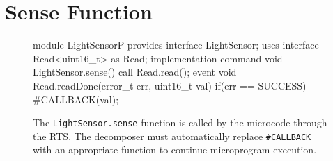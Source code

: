 \chapter{Sense Function}
\label{appendix:sense}

\begin{figure}
  \begin{nesc}
module LightSensorP {
  provides interface LightSensor;
  uses interface Read<uint16_t> as Read;
}
implementation
{
  command void LightSensor.sense() {
    call Read.read();
  }
  event void Read.readDone(error_t err,
   uint16_t val) {
    if(err == SUCCESS) {
      #CALLBACK(val);
    }
  }
}
  \end{nesc}
  \caption[A split-phase hardware driver for reading from the light sensor]{The
  {\tt LightSensor.sense} function is called by the microcode through the RTS.
  The decomposer must automatically replace {\tt\#CALLBACK} with an appropriate
  function to continue microprogram execution.}
  \label{code:hardwareDriver}
\end{figure}
